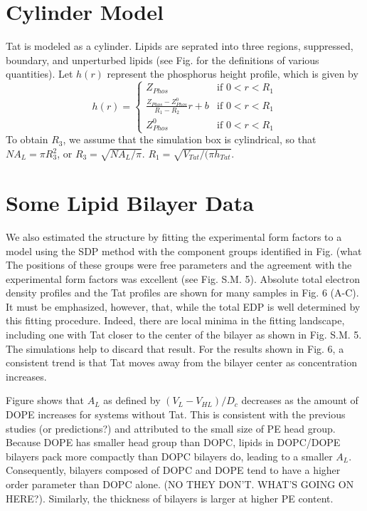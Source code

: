 \documentclass[12pt,letterpaper]{article}
\begin{document}
\section{Cylinder Model}
Tat is modeled as a cylinder. Lipids are seprated into three regions, 
suppressed, boundary, and unperturbed lipids (see Fig. for the definitions
of various quantities). Let $h(r)$ represent the phosphorus height profile,
which is given by
\begin{equation}
  h(r) = \left\{ 
  \begin{array}{cc}
    Z_{Phos} & \text{if } 0 < r < R_1 \\
    \frac{Z_{Phos}-Z_{Phos}^0}{R_1-R_2}r+b & \text{if } 0 < r < R_1 \\
    Z_{Phos}^0 & \text{if } 0 < r < R_1 
  \end{array}\right.  
\end{equation}     
To obtain $R_3$, we assume that the simulation box is cylindrical, so that
$NA_L=\pi R_3^2$, or $R_3=\sqrt{NA_L/\pi}$. $R_1=\sqrt{V_{Tat}/(\pi h_{Tat}}$.

\section{Some Lipid Bilayer Data}
We also estimated the structure by fitting the experimental form factors to a 
model using the SDP method with the component groups identified in Fig. (what  
The positions of 
these groups were free parameters and the agreement with the experimental form 
factors was excellent (see Fig. S.M. 5).  Absolute total electron density 
profiles and the Tat profiles are shown for many samples in Fig. 6 (A-C).  
It must be emphasized, however, that, while the total EDP is well determined by 
this fitting procedure.  Indeed, there are local minima in the fitting landscape, 
including one with Tat closer to the center of the bilayer as shown in Fig. 
S.M. 5.  The simulations help to discard that result. For the results shown in 
Fig. 6, a consistent trend is that Tat moves away from the bilayer center as 
concentration increases. 

Figure shows that $A_L$ as defined by $(V_L-V_{HL})/D_c$ decreases as the 
amount of DOPE increases for systems without Tat. This is consistent with the
previous studies (or predictions?) and attributed to the small size of PE
head group. Because DOPE has smaller head group than DOPC, lipids in DOPC/DOPE
bilayers pack more compactly than DOPC bilayers do, leading to a smaller $A_L$.
Consequently, bilayers composed of DOPC and DOPE tend to have a higher order 
parameter than DOPC alone. (NO THEY DON'T. WHAT'S GOING ON HERE?). Similarly,
the thickness of bilayers is larger at higher PE content. 
\end{document}
